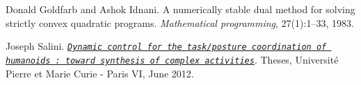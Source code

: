 
\begin{DoxyDescription}
\item[\label{_CITEREF_goldfarb1983numerically}%
\mbox{[}1\mbox{]}]Donald Goldfarb and Ashok Idnani. A numerically stable dual method for solving strictly convex quadratic programs. {\itshape Mathematical programming}, 27(1)\+:1--33, 1983.


\item[\label{_CITEREF_salini2012Thesis}%
\mbox{[}2\mbox{]}]Joseph Salini. \href{https://tel.archives-ouvertes.fr/tel-00710013}{\tt {\itshape Dynamic control for the task/posture coordination of humanoids \+: toward synthesis of complex activities}}. Theses, Universit\'{e} Pierre et Marie Curie -\/ Paris VI, June 2012. 


\end{DoxyDescription}